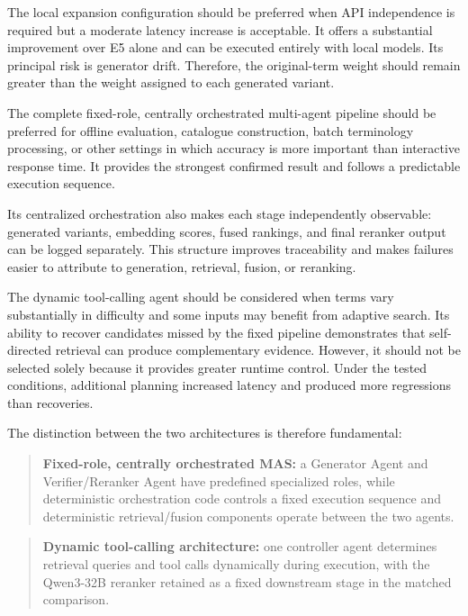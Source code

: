The local expansion configuration should be preferred when API independence is required but a moderate latency increase is acceptable. It offers a substantial improvement over E5 alone and can be executed entirely with local models. Its principal risk is generator drift. Therefore, the original-term weight should remain greater than the weight assigned to each generated variant.

The complete fixed-role, centrally orchestrated multi-agent pipeline should be preferred for offline evaluation, catalogue construction, batch terminology processing, or other settings in which accuracy is more important than interactive response time. It provides the strongest confirmed result and follows a predictable execution sequence.

Its centralized orchestration also makes each stage independently observable: generated variants, embedding scores, fused rankings, and final reranker output can be logged separately. This structure improves traceability and makes failures easier to attribute to generation, retrieval, fusion, or reranking.

The dynamic tool-calling agent should be considered when terms vary substantially in difficulty and some inputs may benefit from adaptive search. Its ability to recover candidates missed by the fixed pipeline demonstrates that self-directed retrieval can produce complementary evidence. However, it should not be selected solely because it provides greater runtime control. Under the tested conditions, additional planning increased latency and produced more regressions than recoveries.

The distinction between the two architectures is therefore fundamental:

\begin{quote}
\textbf{Fixed-role, centrally orchestrated MAS:} a Generator Agent and Verifier/Reranker Agent have predefined specialized roles, while deterministic orchestration code controls a fixed execution sequence and deterministic retrieval/fusion components operate between the two agents.
\end{quote}

\begin{quote}
\textbf{Dynamic tool-calling architecture:} one controller agent determines retrieval queries and tool calls dynamically during execution, with the Qwen3-32B reranker retained as a fixed downstream stage in the matched comparison.
\end{quote}

